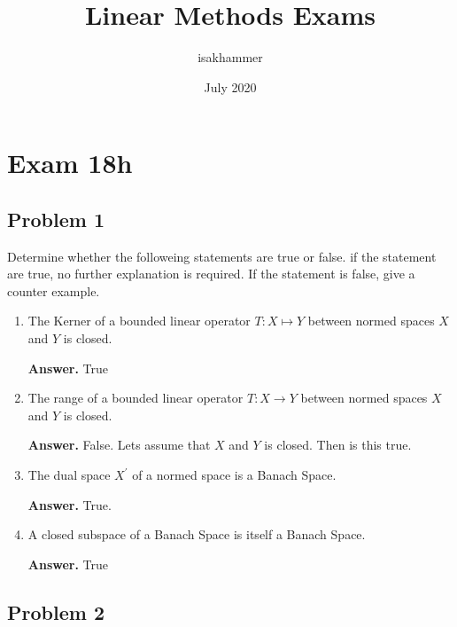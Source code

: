 \documentclass{article}
\title{Linear Methods Exams}
\author{isakhammer }
\date{July 2020}
\theoremstyle{remark}
\begin{document}
\maketitle
\tableofcontents
\newpage

\section{Exam 18h}%
\label{sec:exam_18h}

\subsection{Problem 1}%
\label{sub:problem_1}


Determine whether the followeing statements are true or false. if the statement are true, no further explanation is required. If the statement is false, give a counter example.

  \begin{enumerate}
    \item The Kerner of a bounded linear operator $T: X \mapsto Y$ between normed spaces $X$ and $Y$ is closed.
      \begin{tcolorbox}
        \textbf{Answer.}  
        True
      \end{tcolorbox}
    \item The range of a bounded linear operator $T: X \to Y$ between normed spaces $X$ and $Y$ is closed.
      \begin{tcolorbox}
        \textbf{Answer.} 
      False. Lets assume that $X$ and $Y$ is closed. Then is this true. 
      \end{tcolorbox}
    \item The dual space $X^{'}$ of a normed space is a Banach Space.
      \begin{tcolorbox}
        \textbf{Answer.} 
        True.
      \end{tcolorbox}

    \item A closed subspace of a Banach Space is itself a Banach Space.
      \begin{tcolorbox}
        \textbf{Answer.} 
          True
      \end{tcolorbox}
  \end{enumerate}

\subsection{Problem 2}%
\label{sub:problem_2}
\end{document}
